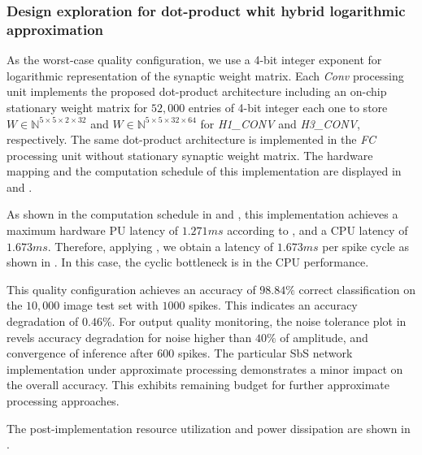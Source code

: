 \subsubsection{Design exploration for dot-product whit hybrid logarithmic approximation}
As the worst-case quality configuration, we use a 4-bit integer exponent for logarithmic representation of the synaptic weight matrix. Each \emph{Conv} processing unit implements the proposed dot-product architecture including an on-chip stationary weight matrix for $52,000$ entries of 4-bit integer each one to store $W\in\mathbb{N}^{5\times 5\times 2\times 32}$ and $W\in\mathbb{N}^{5\times 5\times 32\times 64}$ for \emph{H1\_CONV} and \emph{H3\_CONV}, respectively. The same dot-product architecture is implemented in the \emph{FC} processing unit without stationary synaptic weight matrix. The hardware mapping and the computation schedule of this implementation are displayed in  and .

As shown in the computation schedule in  and , this implementation achieves a maximum hardware PU latency of $1.271 ms$ according to , and a CPU latency of $1.673 ms$. Therefore, applying , we obtain a latency of $1.673 ms$ per spike cycle as shown in . In this case, the cyclic bottleneck is in the CPU performance.

This quality configuration achieves an accuracy of $98.84\%$ correct classification on the $10,000$ image test set with $1000$ spikes. This indicates an accuracy degradation of $0.46\%$. For output quality monitoring, the noise tolerance plot in  revels accuracy degradation for noise higher than $40\%$ of amplitude, and convergence of inference after $600$ spikes. The particular SbS network implementation under approximate processing demonstrates a minor impact on the overall accuracy. This exhibits remaining budget for further approximate processing approaches.

The post-implementation resource utilization and power dissipation are shown in .

